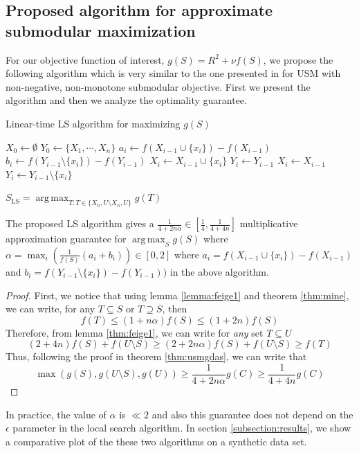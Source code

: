 \subsection{Proposed algorithm for approximate submodular maximization}
\label{subsection:proposed}
For our objective function of interest, $g(S)=R^2+\nu f(S)$, we propose the following algorithm which is very similar to the one presented in \citealp{Buchbinder:2012:TLT:2417500.2417835} for USM with non-negative, non-monotone submodular objective. First we present the algorithm and then we analyze the optimality guarantee.

\begin{algorithm}
Linear-time LS algorithm for maximizing $g(S)$
\begin{algorithmic}[1]
\State $X_0\gets \emptyset$
\State $Y_0\gets \{X_1,\cdots,X_n\}$
  \State $a_i\gets f(X_{i-1}\cup\{x_i\})-f(X_{i-1})$
  \State $b_i\gets f(Y_{i-1}\setminus\{x_i\})-f(Y_{i-1})$
    \State $X_i\gets X_{i-1}\cup\{x_i\}$
    \State $Y_i\gets Y_{i-1}$
  \Else
    \State $X_i\gets X_{i-1}$
    \State $Y_i\gets Y_{i-1}\setminus \{x_i\}$
  \EndIf
\EndFor
\end{algorithmic}
\Return $S_{\text{LS}}=\operatorname*{arg\,max}_{T:T\in\{X_n,U\setminus X_n,U\}} g(T)$
\end{algorithm}

\begin{theorem}
\label{thm:usmgme}
 The proposed LS algorithm gives a $\frac{1}{4+2 n\alpha}\in[\frac{1}{4},\frac{1}{4+4n}]$ multiplicative approximation guarantee for $\operatorname*{arg\,max}_{S} g(S)$ where $\alpha=\max_i(\frac{1}{f(S)}(a_i+b_i))\in [0,2]$ where $a_i = f(X_{i-1}\cup\{x_i\})-f(X_{i-1})$ and $b_i = f(Y_{i-1}\setminus\{x_i\})-f(Y_{i-1}))$ in the above algorithm.
\end{theorem}
\begin{proof}
 First, we notice that using lemma \ref{lemma:feige1} and theorem \ref{thm:mine}, we can write, for any $T\subseteq S$ or $T\supseteq S$, then \[f(T)\le(1+n\alpha)f(S)\le (1+2n)f(S)\]
 Therefore, from lemma \ref{thm:feige1}, we can write for \emph{any} set $T\subseteq U$
 \[(2+4n)f(S)+f(U\setminus S)\ge (2+2n\alpha)f(S)+f(U\setminus S)\ge f(T)\]
 Thus, following the proof in theorem \ref{thm:usmgdas}, we can write that
 \[\max(g(S),g(U\setminus S),g(U))\ge\frac{1}{4+2 n\alpha}g(C)\ge \frac{1}{4+4n}g(C) \]
\end{proof}

\noindent In practice, the value of $\alpha$ is $\ll 2$ and also this guarantee does not depend on the $\epsilon$ parameter in the local search algorithm. In section \ref{subsection:results}, we show a comparative plot of the these two algorithms on a synthetic data set.

